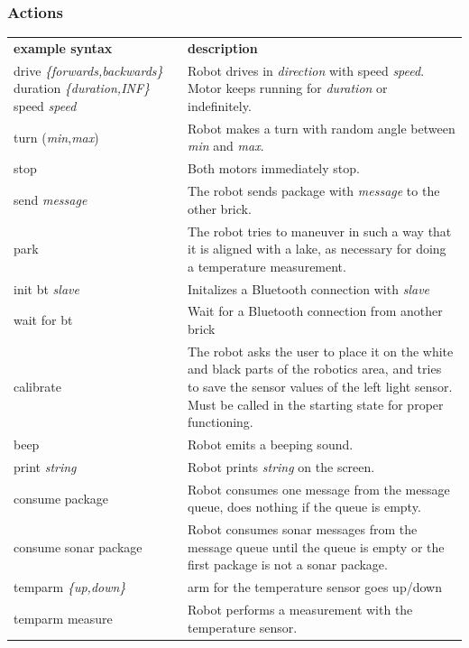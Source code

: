 \documentclass[11pt,a4paper]{article}
\begin{document}
\subsubsection{Actions}
\begin{tabular}{p{6cm}p{10cm}}
\textbf{example syntax} & \textbf{description}\\
drive \emph{\{forwards,backwards\}} duration \emph{\{duration,INF\}} speed \emph{speed} & Robot drives in \emph{direction} with speed \emph{speed}. Motor keeps running for \emph{duration} or indefinitely.\\
turn (\emph{min},\emph{max}) & Robot makes a turn with random angle between \emph{min} and \emph{max}.\\
stop & Both motors immediately stop.\\
send \emph{message} & The robot sends package with \emph{message} to the other brick.\\
park & The robot tries to maneuver in such a way that it is aligned with a lake, as necessary for doing a temperature measurement.\\
init bt \emph{slave}& Initalizes a Bluetooth connection with \emph{slave}\\
wait for bt & Wait for a Bluetooth connection from another brick\\
calibrate & The robot asks the user to place it on the white and black parts of the robotics area, and tries to save the sensor values of the left light sensor. Must be called in the starting state for proper functioning.\\
beep & Robot emits a beeping sound.\\
print \emph{string} & Robot prints \emph{string} on the screen.\\
consume package & Robot consumes one message from the message queue, does nothing if the queue is empty.\\
consume sonar package & Robot consumes sonar messages from the message queue until the queue is empty or the first package is not a sonar package.\\
temparm \emph{\{up,down\}} & arm for the temperature sensor goes up/down\\
temparm measure & Robot performs a measurement with the temperature sensor.\\
\end{tabular}
\end{document}
